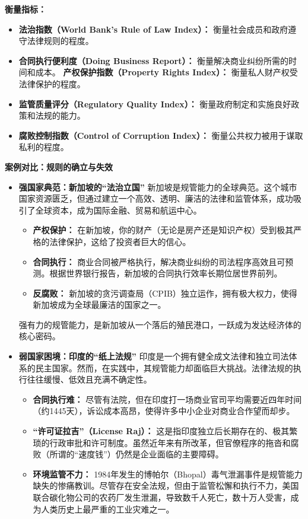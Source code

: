 \textbf{衡量指标：}
\begin{itemize}
    \item \textbf{法治指数（World Bank's Rule of Law Index）：} 衡量社会成员和政府遵守法律规则的程度。
    \item \textbf{合同执行便利度（Doing Business Report）：} 衡量解决商业纠纷所需的时间和成本。
    \textbf{产权保护指数（Property Rights Index）：} 衡量私人财产权受法律保护的程度。
    \item \textbf{监管质量评分（Regulatory Quality Index）：} 衡量政府制定和实施良好政策和法规的能力。
    \item \textbf{腐败控制指数（Control of Corruption Index）：} 衡量公共权力被用于谋取私利的程度。
\end{itemize}

\textbf{案例对比：规则的确立与失效}

\begin{itemize}
    \item \textbf{强国家典范：新加坡的“法治立国”}
    新加坡是规管能力的全球典范。这个城市国家资源匮乏，但通过建立一个高效、透明、廉洁的法律和监管体系，成功吸引了全球资本，成为国际金融、贸易和航运中心。
    \begin{itemize}
        \item \textbf{产权保护：} 在新加坡，你的财产（无论是房产还是知识产权）受到极其严格的法律保护，这给了投资者巨大的信心。
        \item \textbf{合同执行：} 商业合同被严格执行，解决商业纠纷的司法程序高效且可预测。根据世界银行报告，新加坡的合同执行效率长期位居世界前列。
        \item \textbf{反腐败：} 新加坡的贪污调查局（CPIB）独立运作，拥有极大权力，使得新加坡成为全球最廉洁的国家之一。
    \end{itemize}
    强有力的规管能力，是新加坡从一个落后的殖民港口，一跃成为发达经济体的核心密码。
    \item \textbf{弱国家困境：印度的“纸上法规”}
    印度是一个拥有健全成文法律和独立司法体系的民主国家。然而，在实践中，其规管能力却面临巨大挑战。法律法规的执行往往缓慢、低效且充满不确定性。
    \begin{itemize}
        \item \textbf{合同执行难：} 尽管有法院，但在印度打一场商业官司平均需要近四年时间（约1445天），诉讼成本高昂，使得许多中小企业对商业合作望而却步。
        \item \textbf{“许可证拉吉”（License Raj）：} 这是指印度独立后长期存在的、极其繁琐的行政审批和许可制度。虽然近年来有所改革，但官僚程序的拖沓和腐败（所谓的“速度钱”）仍然是企业面临的主要障碍。
        \item \textbf{环境监管不力：} 1984年发生的博帕尔（Bhopal）毒气泄漏事件是规管能力缺失的惨痛教训。尽管存在安全法规，但由于监管松懈和执行不力，美国联合碳化物公司的农药厂发生泄漏，导致数千人死亡，数十万人受害，成为人类历史上最严重的工业灾难之一。
    \end{itemize}
\end{itemize}

